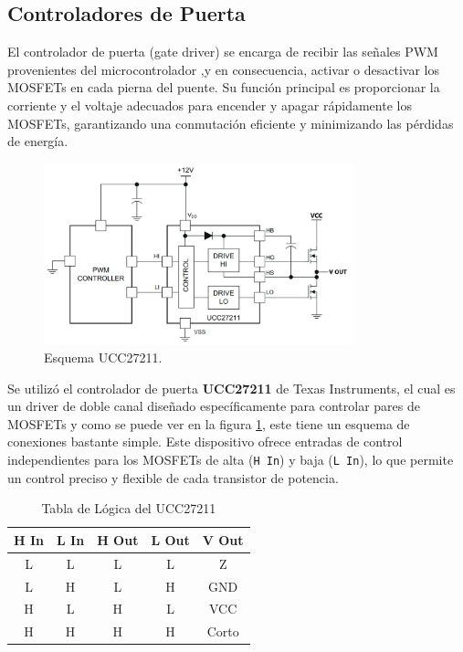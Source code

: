 \documentclass[11pt]{report}
\begin{document}
\newpage
\subsection{Controladores de Puerta}

El controlador de puerta (gate driver) se encarga de recibir las señales PWM provenientes del microcontrolador ,y en consecuencia, activar o desactivar los MOSFETs en cada pierna del puente. Su función principal es proporcionar la corriente y el voltaje adecuados para encender y apagar rápidamente los MOSFETs, garantizando una conmutación eficiente y minimizando las pérdidas de energía.

\begin{figure}[ht]
	\centering
	\includegraphics[width=0.8\textwidth]{imagenes/Diagramas/UCC27211.png}
	\caption{Esquema UCC27211.}
	\label{UCC27211}
\end{figure}
\FloatBarrier

Se utilizó el controlador de puerta \textbf{UCC27211} de Texas Instruments, el cual es un driver de doble canal diseñado específicamente para controlar pares de MOSFETs y como se puede ver en la figura \ref{UCC27211}, este tiene un esquema de conexiones bastante simple. Este dispositivo ofrece entradas de control independientes para los MOSFETs de alta (\texttt{H In}) y baja (\texttt{L In}), lo que permite un control preciso y flexible de cada transistor de potencia.

\begin{table}[ht]
	\centering
	\caption{Tabla de Lógica del UCC27211}
	\label{tab:device_logic}
	\begin{tabular}{|c|c|c|c|c|}
		\hline
		\textbf{H In} & \textbf{L In} & \textbf{H Out} & \textbf{L Out} & \textbf{V Out} \\ \hline
		L             & L             & L              & L              & Z              \\ \hline
		L             & H             & L              & H              & GND            \\ \hline
		H             & L             & H              & L              & VCC            \\ \hline
		H             & H             & H              & H              & Corto          \\ \hline
	\end{tabular}
\end{table}
\FloatBarrier
\end{document}
